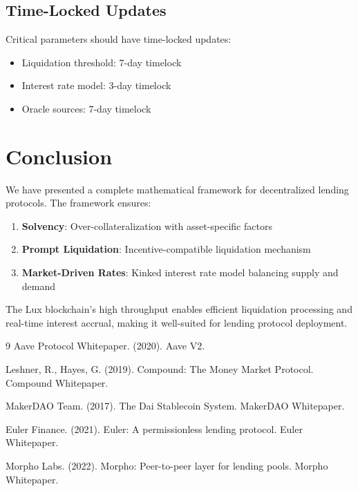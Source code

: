 \documentclass[11pt,a4paper]{article}
\theoremstyle{definition}
\begin{document}
\subsection{Time-Locked Updates}

Critical parameters should have time-locked updates:
\begin{itemize}
\item Liquidation threshold: 7-day timelock
\item Interest rate model: 3-day timelock
\item Oracle sources: 7-day timelock
\end{itemize}

\section{Conclusion}

We have presented a complete mathematical framework for decentralized lending protocols. The framework ensures:

\begin{enumerate}
\item \textbf{Solvency}: Over-collateralization with asset-specific factors
\item \textbf{Prompt Liquidation}: Incentive-compatible liquidation mechanism
\item \textbf{Market-Driven Rates}: Kinked interest rate model balancing supply and demand
\end{enumerate}

The Lux blockchain's high throughput enables efficient liquidation processing and real-time interest accrual, making it well-suited for lending protocol deployment.

\begin{thebibliography}{9}
Aave Protocol Whitepaper. (2020). Aave V2.

Leshner, R., Hayes, G. (2019). Compound: The Money Market Protocol. Compound Whitepaper.

MakerDAO Team. (2017). The Dai Stablecoin System. MakerDAO Whitepaper.

Euler Finance. (2021). Euler: A permissionless lending protocol. Euler Whitepaper.

Morpho Labs. (2022). Morpho: Peer-to-peer layer for lending pools. Morpho Whitepaper.
\end{thebibliography}
\end{document}
